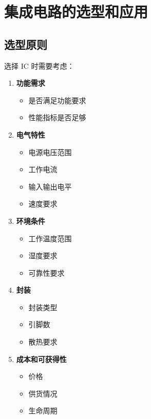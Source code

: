 \section{集成电路的选型和应用}

\subsection{选型原则}

选择 IC 时需要考虑：

\begin{enumerate}
  \item \textbf{功能需求}
    \begin{itemize}
      \item 是否满足功能要求
      \item 性能指标是否足够
    \end{itemize}

  \item \textbf{电气特性}
    \begin{itemize}
      \item 电源电压范围
      \item 工作电流
      \item 输入输出电平
      \item 速度要求
    \end{itemize}

  \item \textbf{环境条件}
    \begin{itemize}
      \item 工作温度范围
      \item 湿度要求
      \item 可靠性要求
    \end{itemize}

  \item \textbf{封装}
    \begin{itemize}
      \item 封装类型
      \item 引脚数
      \item 散热要求
    \end{itemize}

  \item \textbf{成本和可获得性}
    \begin{itemize}
      \item 价格
      \item 供货情况
      \item 生命周期
    \end{itemize}
\end{enumerate}

